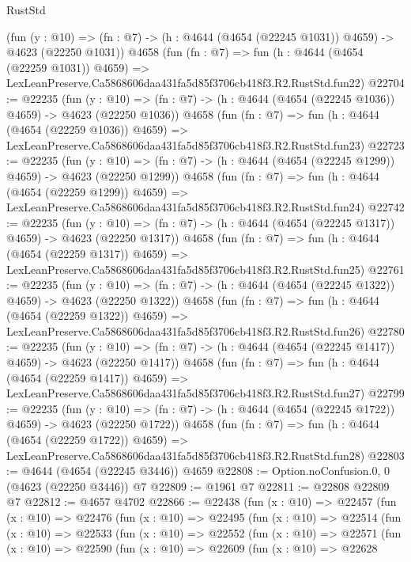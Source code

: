 \begin{lexlean}{RustStd}
\begin{coremodule}
    (fun (y : @10) => (fn : @7) -> (h : @4644 (@4654 (@22245 @1031)) @4659) -> @4623 (@22250 @1031))
    @4658
    (fun (fn : @7) =>
    fun (h : @4644 (@4654 (@22259 @1031)) @4659) =>
    LexLeanPreserve.Ca5868606daa431fa5d85f3706cb418f3.R2.RustStd.fun22)
@22704 := @22235
    (fun (y : @10) => (fn : @7) -> (h : @4644 (@4654 (@22245 @1036)) @4659) -> @4623 (@22250 @1036))
    @4658
    (fun (fn : @7) =>
    fun (h : @4644 (@4654 (@22259 @1036)) @4659) =>
    LexLeanPreserve.Ca5868606daa431fa5d85f3706cb418f3.R2.RustStd.fun23)
@22723 := @22235
    (fun (y : @10) => (fn : @7) -> (h : @4644 (@4654 (@22245 @1299)) @4659) -> @4623 (@22250 @1299))
    @4658
    (fun (fn : @7) =>
    fun (h : @4644 (@4654 (@22259 @1299)) @4659) =>
    LexLeanPreserve.Ca5868606daa431fa5d85f3706cb418f3.R2.RustStd.fun24)
@22742 := @22235
    (fun (y : @10) => (fn : @7) -> (h : @4644 (@4654 (@22245 @1317)) @4659) -> @4623 (@22250 @1317))
    @4658
    (fun (fn : @7) =>
    fun (h : @4644 (@4654 (@22259 @1317)) @4659) =>
    LexLeanPreserve.Ca5868606daa431fa5d85f3706cb418f3.R2.RustStd.fun25)
@22761 := @22235
    (fun (y : @10) => (fn : @7) -> (h : @4644 (@4654 (@22245 @1322)) @4659) -> @4623 (@22250 @1322))
    @4658
    (fun (fn : @7) =>
    fun (h : @4644 (@4654 (@22259 @1322)) @4659) =>
    LexLeanPreserve.Ca5868606daa431fa5d85f3706cb418f3.R2.RustStd.fun26)
@22780 := @22235
    (fun (y : @10) => (fn : @7) -> (h : @4644 (@4654 (@22245 @1417)) @4659) -> @4623 (@22250 @1417))
    @4658
    (fun (fn : @7) =>
    fun (h : @4644 (@4654 (@22259 @1417)) @4659) =>
    LexLeanPreserve.Ca5868606daa431fa5d85f3706cb418f3.R2.RustStd.fun27)
@22799 := @22235
    (fun (y : @10) => (fn : @7) -> (h : @4644 (@4654 (@22245 @1722)) @4659) -> @4623 (@22250 @1722))
    @4658
    (fun (fn : @7) =>
    fun (h : @4644 (@4654 (@22259 @1722)) @4659) =>
    LexLeanPreserve.Ca5868606daa431fa5d85f3706cb418f3.R2.RustStd.fun28)
@22803 := @4644 (@4654 (@22245 @3446)) @4659
@22808 := Option.noConfusion.{0, 0} (@4623 (@22250 @3446)) @7
@22809 := @1961 @7
@22811 := @22808 @22809 @7
@22812 := @4657 @4702
@22866 := @22438
    (fun (x : @10) =>
    @22457
      (fun (x : @10) =>
      @22476
        (fun (x : @10) =>
        @22495
          (fun (x : @10) =>
          @22514
            (fun (x : @10) =>
            @22533
              (fun (x : @10) =>
              @22552
                (fun (x : @10) =>
                @22571
                  (fun (x : @10) =>
                  @22590
                    (fun (x : @10) =>
                    @22609
                      (fun (x : @10) =>
                      @22628

\end{coremodule}
\end{lexlean}

